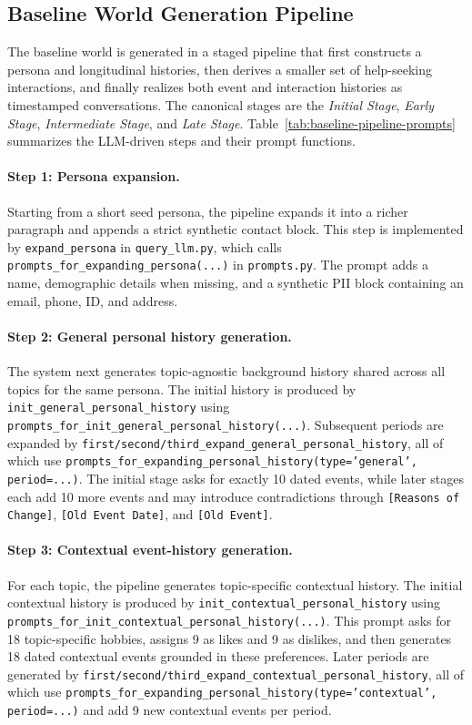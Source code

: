 \subsection{Baseline World Generation Pipeline}
\label{app:baseline-world-pipeline}

The baseline world is generated in a staged pipeline that first constructs a persona and longitudinal histories, then derives a smaller set of help-seeking interactions, and finally realizes both event and interaction histories as timestamped conversations. The canonical stages are the \emph{Initial Stage}, \emph{Early Stage}, \emph{Intermediate Stage}, and \emph{Late Stage}. Table~\ref{tab:baseline-pipeline-prompts} summarizes the LLM-driven steps and their prompt functions.

\paragraph{Step 1: Persona expansion.}
Starting from a short seed persona, the pipeline expands it into a richer paragraph and appends a strict synthetic contact block. This step is implemented by \texttt{expand\_persona} in \texttt{query\_llm.py}, which calls \texttt{prompts\_for\_expanding\_persona(...)} in \texttt{prompts.py}. The prompt adds a name, demographic details when missing, and a synthetic PII block containing an email, phone, ID, and address.

\paragraph{Step 2: General personal history generation.}
The system next generates topic-agnostic background history shared across all topics for the same persona. The initial history is produced by \texttt{init\_general\_personal\_history} using \texttt{prompts\_for\_init\_general\_personal\_history(...)}. Subsequent periods are expanded by \texttt{first/second/third\_expand\_general\_personal\_history}, all of which use \texttt{prompts\_for\_expanding\_personal\_history(type='general', period=...)}. The initial stage asks for exactly 10 dated events, while later stages each add 10 more events and may introduce contradictions through \texttt{[Reasons of Change]}, \texttt{[Old Event Date]}, and \texttt{[Old Event]}.

\paragraph{Step 3: Contextual event-history generation.}
For each topic, the pipeline generates topic-specific contextual history. The initial contextual history is produced by \texttt{init\_contextual\_personal\_history} using \texttt{prompts\_for\_init\_contextual\_personal\_history(...)}. This prompt asks for 18 topic-specific hobbies, assigns 9 as likes and 9 as dislikes, and then generates 18 dated contextual events grounded in these preferences. Later periods are generated by \texttt{first/second/third\_expand\_contextual\_personal\_history}, all of which use \texttt{prompts\_for\_expanding\_personal\_history(type='contextual', period=...)} and add 9 new contextual events per period.

